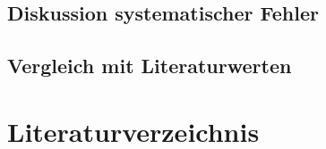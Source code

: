 \documentclass[12pt,a4paper,titlepage,headinclude,bibtotoc]{scrartcl}
\begin{document}
    

\subsection{Diskussion systematischer Fehler}



\subsection{Vergleich mit Literaturwerten}

\section{Literaturverzeichnis}






         
         
         
\end{document}
